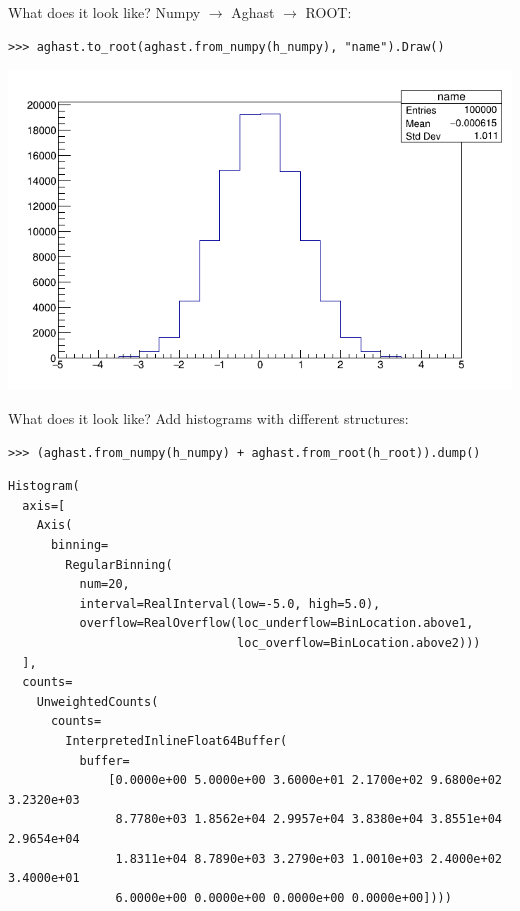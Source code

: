 \documentclass[aspectratio=169]{beamer}
\begin{document}
\begin{frame}[fragile]{What does it look like?}
\vspace{0.5 cm}
\small
{\large Numpy $\to$ Aghast $\to$ ROOT:}
\begin{verbatim}
>>> aghast.to_root(aghast.from_numpy(h_numpy), "name").Draw()
\end{verbatim}

\begin{center}
\includegraphics[width=0.65\linewidth]{c1.png}
\end{center}
\end{frame}

\begin{frame}[fragile]{What does it look like?}
\vspace{0.25 cm}
Add histograms with different structures:

\small
\begin{verbatim}
>>> (aghast.from_numpy(h_numpy) + aghast.from_root(h_root)).dump()
\end{verbatim}

\scriptsize
\begin{verbatim}
Histogram(
  axis=[
    Axis(
      binning=
        RegularBinning(
          num=20,
          interval=RealInterval(low=-5.0, high=5.0),
          overflow=RealOverflow(loc_underflow=BinLocation.above1,
                                loc_overflow=BinLocation.above2)))
  ],
  counts=
    UnweightedCounts(
      counts=
        InterpretedInlineFloat64Buffer(
          buffer=
              [0.0000e+00 5.0000e+00 3.6000e+01 2.1700e+02 9.6800e+02 3.2320e+03
               8.7780e+03 1.8562e+04 2.9957e+04 3.8380e+04 3.8551e+04 2.9654e+04
               1.8311e+04 8.7890e+03 3.2790e+03 1.0010e+03 2.4000e+02 3.4000e+01
               6.0000e+00 0.0000e+00 0.0000e+00 0.0000e+00])))
\end{verbatim}
\end{frame}
\end{document}
